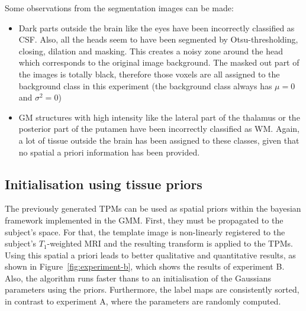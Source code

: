 Some observations from the segmentation images can be made:
\begin{itemize}
  \item Dark parts outside the brain like the eyes have been incorrectly classified as CSF. Also, all the heads seem to have been segmented by Otsu-thresholding, closing, dilation and masking. This creates a noisy zone around the head which corresponds to the original image background. The masked out part of the images is totally black, therefore those voxels are all assigned to the background class in this experiment (the background class always has $\mu = 0$ and $\sigma^2 = 0$)
  \item GM structures with high intensity like the lateral part of the thalamus or the posterior part of the putamen have been incorrectly classified as WM. Again, a lot of tissue outside the brain has been assigned to these classes, given that no spatial a priori information has been provided.
\end{itemize}




\subsection{Initialisation using tissue priors}
The previously generated TPMs can be used as spatial priors within the bayesian framework implemented in the GMM. First, they must be propagated to the subject's space. For that, the template image is non-linearly registered to the subject's $T_1$-weighted MRI and the resulting transform is applied to the TPMs. Using this spatial a priori leads to better qualitative and quantitative results, as shown in Figure~\ref{fig:experiment-b}, which shows the results of experiment B. Also, the algorithm runs faster thans to an initialisation of the Gaussians parameters using the priors. Furthermore, the label maps are consistently sorted, in contrast to experiment A, where the parameters are randomly computed.

